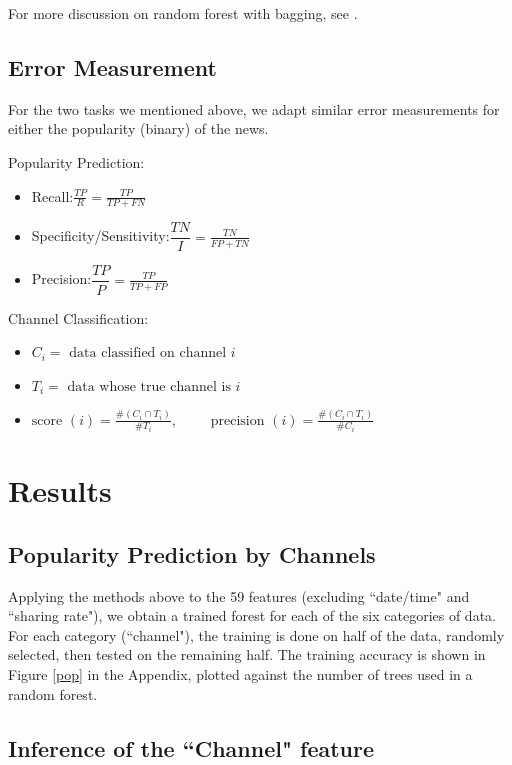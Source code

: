 \documentclass{article} %
\begin{document}
For more discussion on random forest with bagging, see \cite{breiman2001random, breiman1996bagging}.
\subsection{Error Measurement}
For the two tasks we mentioned above, we adapt similar error measurements for either the popularity (binary) of the news.

Popularity Prediction:
\begin{itemize}
\item {Recall}:$\displaystyle{\frac{TP}{R}} = \displaystyle\frac{TP}{TP+FN}$
\item {Specificity/Sensitivity}:$\dfrac{TN}{I} = \displaystyle\frac{TN}{FP+TN}$
\item {Precision}:$\dfrac{TP}{P} = \displaystyle\frac{TP}{TP+FP}$
\\
\end{itemize}

Channel Classification:
\begin{itemize}
\item $C_i = \text{ data classified on channel } i$
\item $T_i = \text{ data whose true channel is } i$
\item $\text{score }(i) = \displaystyle\frac{\#(C_i \cap T_i)}{\# T_i},$ $\qquad \text{precision }(i) = \displaystyle\frac{\#(C_i \cap T_i)}{\# C_i}$
\\
\end{itemize}




\section{Results}
\subsection{Popularity Prediction by Channels}

Applying the methods above to the 59 features (excluding ``date/time" and ``sharing rate"), we obtain a trained forest for each of the six categories of data. For each category (``channel"), the training is
done on half of the data, randomly selected, then tested on the remaining half. The training accuracy is shown in Figure \ref{pop} in the Appendix, plotted against the number of trees used in a random forest. 

\subsection{Inference of the ``Channel" feature}
\end{document}
